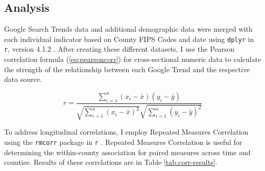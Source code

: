 
\subsection{Analysis}
Google Search Trends data and additional demographic data were merged with each
individual indicator based on County FIPS Codes and date using \texttt{dplyr} in
\texttt{r}, version 4.1.2 \citep{tidyverse}. After creating these different
datasets, I use the Pearson correlation formula (\eqref{eq:pearsoncorr}) for
cross-sectional numeric data to calculate the strength of the relationship
between each Google Trend and the respective data source.

\begin{equation}
 r =
  \frac{ \sum_{i=1}^{n}(x_i-\bar{x})(y_i-\bar{y}) }{
        \sqrt{\sum_{i=1}^{n}(x_i-\bar{x})^2}\sqrt{\sum_{i=1}^{n}(y_i-\bar{y})^2}} \label{eq:pearsoncorr}
\end{equation}

To address longitudinal correlations, I employ Repeated Measures Correlation
using the \texttt{rmcorr} package in \texttt{r} \citep{bland1995, bakdash2017}. 
Repeated Measures Correlation is useful for determining the within-county
association for paired measures across time and counties. Results of these 
correlations are in Table \ref{tab:corr-results}.

